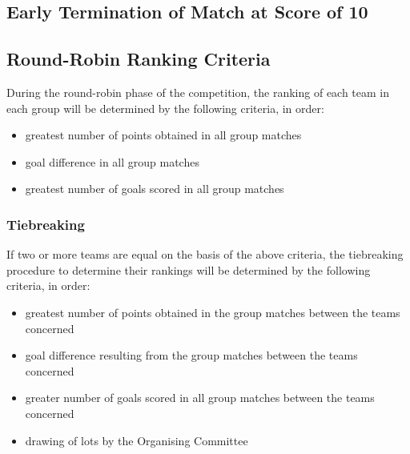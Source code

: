 

\subsection{Early Termination of Match at Score of 10}


\subsection{Round-Robin Ranking Criteria}

During the round-robin phase of the competition, the ranking of each team in each group will be determined by the following criteria, in order:
\begin{itemize}
\item greatest number of points obtained in all group matches\removed{;}
\item goal difference in all group matches\removed{;}
\item greatest number of goals scored in all group matches
\end{itemize}

\subsubsection{Tiebreaking}
If two or more teams are equal on the basis of the above criteria, the tiebreaking procedure to determine their rankings will be determined by the following criteria, in order:
\begin{itemize}
\item greatest number of points obtained in the group matches between the teams concerned\removed{;}
\item goal difference resulting from the group matches between the teams concerned\removed{;}
\item greater number of goals scored in all group matches between the teams concerned\removed{;}
\item drawing of lots by the Organising Committee
\end{itemize}
